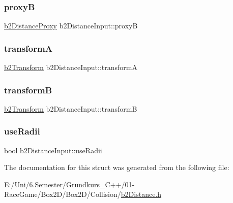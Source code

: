 \mbox{\label{structb2_distance_input_ad08521a9cdf9d418ececfd44de83a5d3}} 
\subsubsection{\texorpdfstring{proxyB}{proxyB}}
{\footnotesize\ttfamily \mbox{\hyperlink{structb2_distance_proxy}{b2\+Distance\+Proxy}} b2\+Distance\+Input\+::proxyB}

\mbox{\label{structb2_distance_input_a0889c2f7120ba521d6e40e2a22834ddb}} 
\subsubsection{\texorpdfstring{transformA}{transformA}}
{\footnotesize\ttfamily \mbox{\hyperlink{structb2_transform}{b2\+Transform}} b2\+Distance\+Input\+::transformA}

\mbox{\label{structb2_distance_input_a47352d7c5b3db80b2fb8cf338f1c1895}} 
\subsubsection{\texorpdfstring{transformB}{transformB}}
{\footnotesize\ttfamily \mbox{\hyperlink{structb2_transform}{b2\+Transform}} b2\+Distance\+Input\+::transformB}

\mbox{\label{structb2_distance_input_ab72a770be4a91997d00112409de5fea7}} 
\subsubsection{\texorpdfstring{useRadii}{useRadii}}
{\footnotesize\ttfamily bool b2\+Distance\+Input\+::use\+Radii}



The documentation for this struct was generated from the following file\+:\begin{DoxyCompactItemize}
\item 
E\+:/\+Uni/6.\+Semester/\+Grundkurs\+\_\+\+C++/01-\/\+Race\+Game/\+Box2\+D/\+Box2\+D/\+Collision/\mbox{\hyperlink{b2_distance_8h}{b2\+Distance.\+h}}\end{DoxyCompactItemize}
